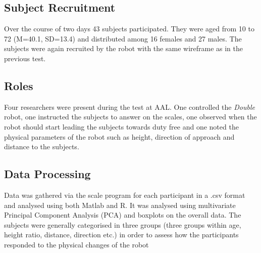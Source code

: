 \subsection{Subject Recruitment}
Over the course of two days 43 subjects participated. They were aged from 10 to 72 (M=40.1, SD=13.4) and distributed among 16 females and 27 males. The subjects were again recruited by the robot with the same wireframe as in the previous test.

\subsection{Roles}
Four researchers were present during the test at AAL. One controlled the \textit{Double} robot, one instructed the subjects to answer on the scales, one observed when the robot should start leading the subjects towards duty free and one noted the physical parameters of the robot such as height, direction of approach and distance to the subjects.

\subsection{Data Processing}
Data was gathered via the scale program for each participant in a .csv format and analysed using both Matlab and R. It was analysed using multivariate Principal Component Analysis (PCA) and boxplots on the overall data. The subjects were generally categorised in three groups (three groups within age, height ratio, distance, direction etc.) in order to assess how the participants responded to the physical changes of the robot 